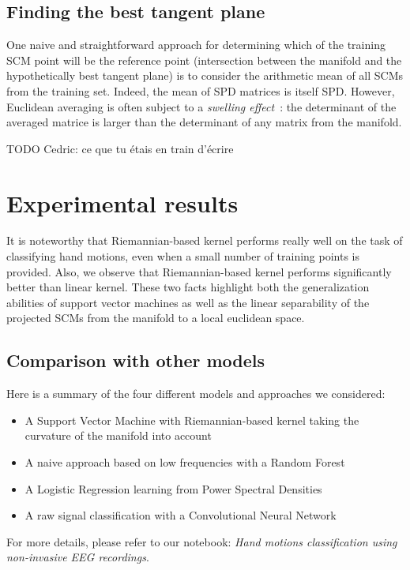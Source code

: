 \documentclass[a4paper,11pt]{report}
\begin{document}
\section{Finding the best tangent plane}

One naive and straightforward approach for determining which of the training SCM point will be the reference point
(intersection between the manifold and the hypothetically best tangent plane)
is to consider the arithmetic mean of all SCMs from the training set. Indeed, the mean of SPD matrices is itself
SPD. However, Euclidean averaging is often subject to a \textit{swelling effect}~\citep{doi:10.1137/050637996}: 
the determinant of the averaged matrice is larger than the determinant of any matrix from the manifold.

TODO Cedric: ce que tu étais en train d'écrire

\chapter{Experimental results}

It is noteworthy that Riemannian-based kernel performs really well on the task of classifying hand
motions, even when a small number of training points is provided. 
Also, we observe that Riemannian-based kernel performs significantly better than linear kernel.
These two facts highlight both the generalization abilities of support vector machines as well as the linear separability
of the projected SCMs from the manifold to a local euclidean space.

\section{Comparison with other models}

Here is a summary of the four different models and approaches we considered:
\begin{itemize}
  \item A Support Vector Machine with Riemannian-based kernel taking the curvature of the manifold into account
  \item A naive approach based on low frequencies with a Random Forest
  \item A Logistic Regression learning from Power Spectral Densities
  \item A raw signal classification with a Convolutional Neural Network
\end{itemize}
For more details, please refer to our notebook:
\textit{Hand motions classification using non-invasive EEG recordings}.
\end{document}
